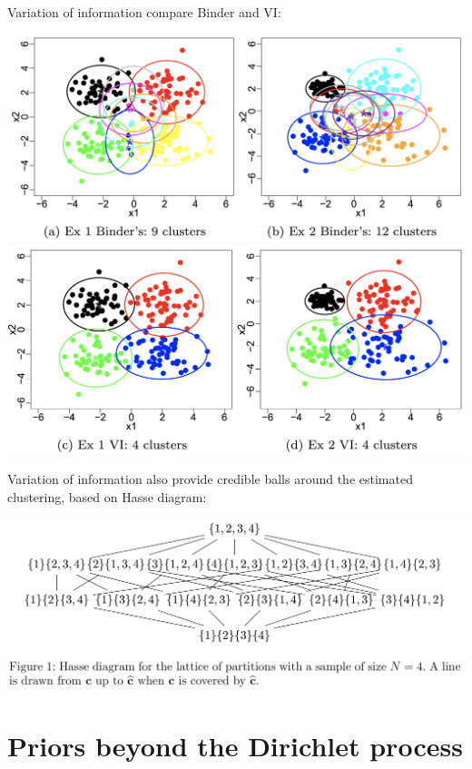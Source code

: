 {Variation of information}
\citet{wade2018bayesian} 
compare Binder and VI:\bigskip

\begin{center}
\includegraphics[width=.7\textwidth]{figures_julyan/mixtures/wade_example_binder}
\includegraphics[width=.7\textwidth]{figures_julyan/mixtures/wade_example_VI}	
\end{center}



{Variation of information}
\citet{wade2018bayesian} 
also provide \alert{credible balls} around the estimated clustering, based on Hasse diagram:\bigskip

\includegraphics[width=\textwidth]{figures_julyan/mixtures/hasse_diagram}



\section{Priors beyond the Dirichlet process}





